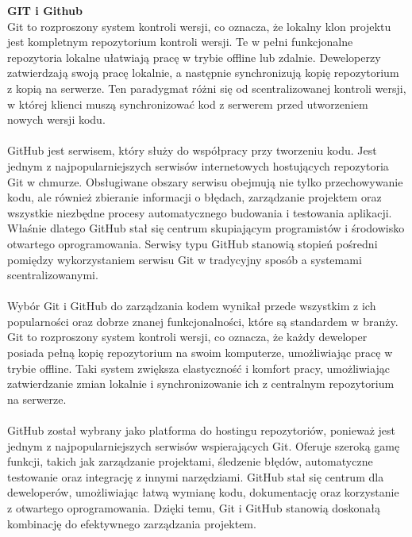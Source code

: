 \documentclass[twoside]{projektInzynierskiMS1}
\begin{document}
\noindent \textbf{GIT i Github}\\
Git to rozproszony system kontroli wersji, co oznacza, że lokalny klon projektu jest kompletnym repozytorium kontroli wersji. Te w pełni funkcjonalne repozytoria lokalne ułatwiają pracę w trybie offline lub zdalnie. Deweloperzy zatwierdzają swoją pracę lokalnie, a następnie synchronizują kopię repozytorium z kopią na serwerze. Ten paradygmat różni się od scentralizowanej kontroli wersji, w której klienci muszą synchronizować kod z serwerem przed utworzeniem nowych wersji kodu.
\\\\
GitHub jest serwisem, który służy do współpracy przy tworzeniu kodu. Jest jednym z najpopularniejszych serwisów internetowych hostujących repozytoria Git w chmurze. Obsługiwane obszary serwisu obejmują nie tylko przechowywanie kodu, ale również zbieranie informacji o błędach, zarządzanie projektem oraz wszystkie niezbędne procesy automatycznego budowania i testowania aplikacji. Właśnie dlatego GitHub stał się centrum skupiającym programistów i środowisko otwartego oprogramowania. Serwisy typu GitHub stanowią stopień pośredni pomiędzy wykorzystaniem serwisu Git w tradycyjny sposób a systemami scentralizowanymi.
\\\\
Wybór Git i GitHub do zarządzania kodem wynikał przede wszystkim z ich popularności oraz dobrze znanej funkcjonalności, które są standardem w branży. Git to rozproszony system kontroli wersji, co oznacza, że każdy deweloper posiada pełną kopię repozytorium na swoim komputerze, umożliwiając pracę w trybie offline. Taki system zwiększa elastyczność i komfort pracy, umożliwiając zatwierdzanie zmian lokalnie i synchronizowanie ich z centralnym repozytorium na serwerze.
\\\\
GitHub został wybrany jako platforma do hostingu repozytoriów, ponieważ jest jednym z najpopularniejszych serwisów wspierających Git. Oferuje szeroką gamę funkcji, takich jak zarządzanie projektami, śledzenie błędów, automatyczne testowanie oraz integrację z innymi narzędziami. GitHub stał się centrum dla deweloperów, umożliwiając łatwą wymianę kodu, dokumentację oraz korzystanie z otwartego oprogramowania. Dzięki temu, Git i GitHub stanowią doskonałą kombinację do efektywnego zarządzania projektem.
\\\\
\end{document}
